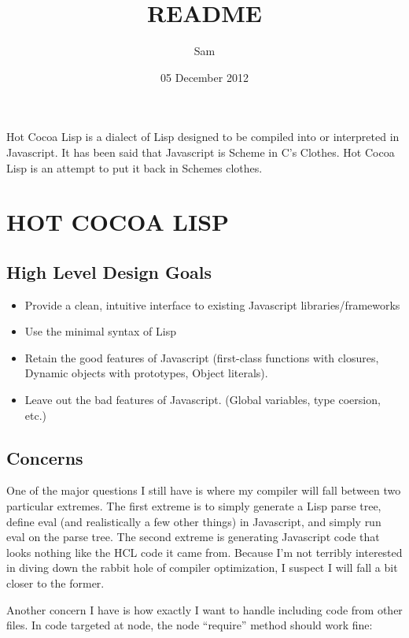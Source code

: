 \documentclass[11pt]{article}
\title{README}
\author{Sam}
\date{05 December 2012}
\begin{document}
\maketitle

\setcounter{tocdepth}{3}
\tableofcontents
\vspace*{1cm}
  Hot Cocoa Lisp is a dialect of Lisp designed to be compiled into or
  interpreted in Javascript.  It has been said that Javascript is
  Scheme in C's Clothes.  Hot Cocoa Lisp is an attempt to put it back
  in Schemes clothes.
\section{HOT COCOA LISP}
\label{sec-1}


\subsection{High Level Design Goals}
\label{sec-1.1}

\begin{itemize}
\item Provide a clean, intuitive interface to existing
     Javascript libraries/frameworks
\item Use the minimal syntax of Lisp
\item Retain the good features of Javascript
     (first-class functions with closures, Dynamic objects with prototypes,
     Object literals).
\item Leave out the bad features of Javascript.
     (Global variables, type coersion, etc.)
\end{itemize}
\subsection{Concerns}
\label{sec-1.2}

   One of the major questions I still have is where my compiler will fall
   between two particular extremes.  The first extreme is to simply generate
   a Lisp parse tree, define eval (and realistically a few other things) in
   Javascript, and simply run eval on the parse tree.  The second extreme is
   generating Javascript code that looks nothing like the HCL code it came
   from.  Because I'm not terribly interested in diving down the rabbit hole
   of compiler optimization, I suspect I will fall a bit closer to the former.
   
   Another concern I have is how exactly I want to handle including code from
   other files.  In code targeted at node, the node ``require'' method should work
   fine:
   
\end{document}
